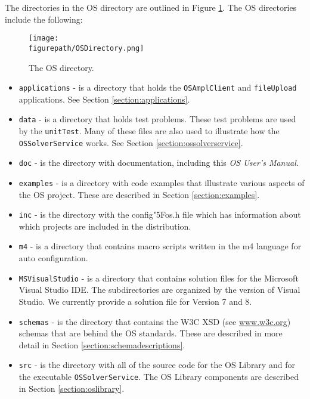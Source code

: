 \documentclass[11pt]{article}
\newcommand{\figurepath}{./figures}
\newcounter{Fig}
\renewcommand{\_}{{\char"5F}}
\renewcommand{\{}{{\char"7B}}
\renewcommand{\}}{{\char"7D}}
\renewcommand{\^}{{\char"0D}}
\renewcommand{\'}{{\char"0D}}
\begin{document}
The directories in the OS directory are outlined in Figure \ref{figure:osdirectory}.  The OS directories include the following:


\begin{figure}
\centering
\texttt{[image: \\figurepath/OSDirectory.png]}
\caption{The OS directory.}
\label{figure:osdirectory}
\end{figure}



\begin{itemize}


\item {\tt applications} - is a directory that holds  the {\tt OSAmplClient} and {\tt fileUpload}  applications.  See Section \ref{section:applications}.

\item {\tt data} - is a directory that holds test problems. These test problems are used by the {\tt unitTest}. Many of these files are also used to illustrate how the {\tt OSSolverService} works. See Section \ref{section:ossolverservice}.

\item {\tt doc} - is the directory with documentation, including this {\it OS User's Manual.}

\item {\tt examples} - is a directory with code examples that illustrate various aspects of the OS project.    These are described in Section \ref{section:examples}.

\item {\tt inc} - is the directory with the config\_os.h file which has information about which projects are included in the distribution.

\item {\tt m4} - is a directory that  contains macro scripts written in the m4 language for auto configuration.

\item {\tt MSVisualStudio} - is a directory that  contains solution files for the Microsoft Visual Studio IDE.  The subdirectories are organized by the version of Visual Studio. We currently provide a solution file for Version 7 and 8.

\item {\tt schemas} - is the directory that contains the W3C XSD (see \url{www.w3c.org}) schemas that are behind the OS standards. These are described in more detail in Section \ref{section:schemadescriptions}.

\item {\tt src} - is the directory with all of the source code for the OS Library and for the executable {\tt OSSolverService}. The OS Library components are described in Section \ref{section:oslibrary}.


\end{itemize}
\end{document}
